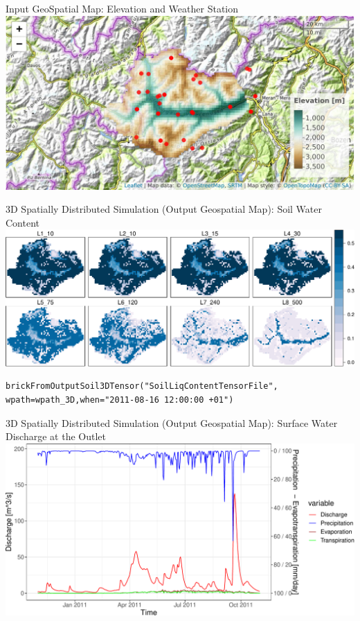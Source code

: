 \documentclass[
  ignorenonframetext,
]{beamer}
\begin{document}
\begin{frame}{Input GeoSpatial Map: Elevation and Weather Station}
\protect\hypertarget{input-geospatial-map-elevation-and-weather-station}{}
\includegraphics{cordanoe_geotopbricks_presenetation_files/figure-beamer/unnamed-chunk-10-1.pdf}
\end{frame}

\begin{frame}[fragile]{3D Spatially Distributed Simulation (Output
Geospatial Map): Soil Water Content}
\protect\hypertarget{d-spatially-distributed-simulation-output-geospatial-map-soil-water-content}{}
\includegraphics{cordanoe_geotopbricks_presenetation_files/figure-beamer/unnamed-chunk-11-1.pdf}

\begin{verbatim}
brickFromOutputSoil3DTensor("SoilLiqContentTensorFile", 
wpath=wpath_3D,when="2011-08-16 12:00:00 +01")
\end{verbatim}
\end{frame}

\begin{frame}{3D Spatially Distributed Simulation (Output Geospatial
Map): Surface Water Discharge at the Outlet}
\protect\hypertarget{d-spatially-distributed-simulation-output-geospatial-map-surface-water-discharge-at-the-outlet}{}
\includegraphics{cordanoe_geotopbricks_presenetation_files/figure-beamer/unnamed-chunk-13-1.pdf}
\end{frame}
\end{document}
